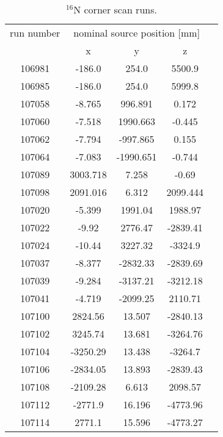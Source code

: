 \begin{table}[ht]
	\caption[]{$^{16}$N corner scan runs.}
	\label{table:n16scanTable_corner}
	\centering
	\begin{tabular*}{90mm}{c@{\extracolsep{\fill}}*4c}
		\toprule 
		run number  & \multicolumn{3}{c}{nominal source position [mm]}  \\
		\cline{2-4}
		& x & y & z\\   
		\midrule
        106981  & -186.0 & 254.0 & 5500.9\\
        106985  & -186.0 & 254.0 & 5999.8\\
        107058  & -8.765 & 996.891 & 0.172\\
        107060  & -7.518 & 1990.663 & -0.445\\
        107062  & -7.794 & -997.865 & 0.155\\
        107064  & -7.083 & -1990.651 & -0.744\\
        107089  & 3003.718 & 7.258 & -0.69\\
        107098  & 2091.016 & 6.312 & 2099.444\\
        107020  & -5.399 &  1991.04 &  1988.97\\
        107022  & -9.92 &  2776.47 &  -2839.41\\
        107024  & -10.44 &  3227.32 &  -3324.9\\
        107037  & -8.377 &  -2832.33 &  -2839.69\\
        107039  & -9.284 &  -3137.21 &  -3212.18\\
        107041  & -4.719 &  -2099.25 &  2110.71\\
        107100  & 2824.56 &  13.507 &  -2840.13\\
        107102  & 3245.74 &  13.681 &  -3264.76\\
        107104  & -3250.29 &  13.438 &  -3264.7\\
        107106  & -2834.05 &  13.893 &  -2839.43\\
        107108  & -2109.28 &  6.613 &  2098.57\\
        107112  & -2771.9 &  16.196 &  -4773.96\\
        107114  & 2771.1 &  15.596 &  -4773.27\\
		\bottomrule	
	\end{tabular*}
\end{table}

